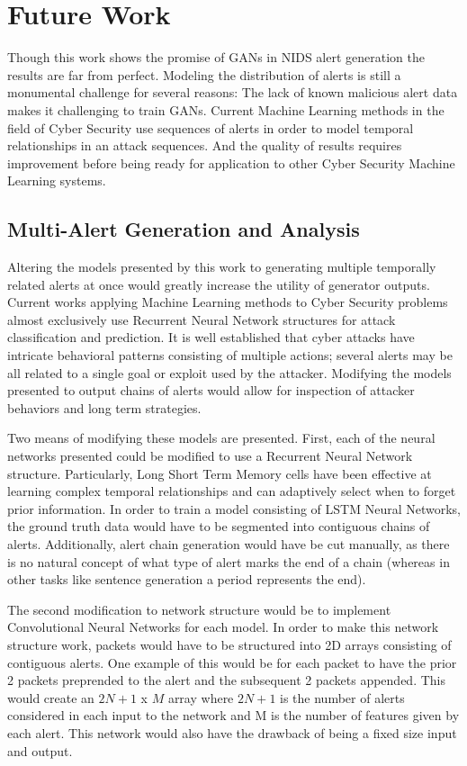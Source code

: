 \section{Future Work}

Though this work shows the promise of GANs in NIDS alert generation the results are far from perfect. Modeling the distribution of alerts is still a monumental challenge for several reasons: The lack of known malicious alert data makes it challenging to train GANs. Current Machine Learning methods in the field of Cyber Security use sequences of alerts in order to model temporal relationships in an attack sequences. And the quality of results requires improvement before being ready for application to other Cyber Security Machine Learning systems.

\subsection{Multi-Alert Generation and Analysis}

Altering the models presented by this work to generating multiple temporally related alerts at once would greatly increase the utility of generator outputs. Current works applying Machine Learning methods to Cyber Security problems almost exclusively use Recurrent Neural Network structures for attack classification and prediction. It is well established that cyber attacks have intricate behavioral patterns consisting of multiple actions; several alerts may be all related to a single goal or exploit used by the attacker. Modifying the models presented to output chains of alerts would allow for inspection of attacker behaviors and long term strategies. 

Two means of modifying these models are presented. First, each of the neural networks presented could be modified to use a Recurrent Neural Network structure. Particularly, Long Short Term Memory cells have been effective at learning complex temporal relationships and can adaptively select when to forget prior information. In order to train a model consisting of LSTM Neural Networks, the ground truth data would have to be segmented into contiguous chains of alerts. Additionally, alert chain generation would have be cut manually, as there is no natural concept of what type of alert marks the end of a chain (whereas in other tasks like sentence generation a period represents the end). 

The second modification to network structure would be to implement Convolutional Neural Networks for each model. In order to make this network structure work, packets would have to be structured into 2D arrays consisting of contiguous alerts. One example of this would be for each packet to have the prior 2 packets preprended to the alert and the subsequent 2 packets appended. This would create an $2N+1$ x $M$ array where $2N+1$ is the number of alerts considered in each input to the network and M is the number of features given by each alert. This network would also have the drawback of being a fixed size input and output. 

